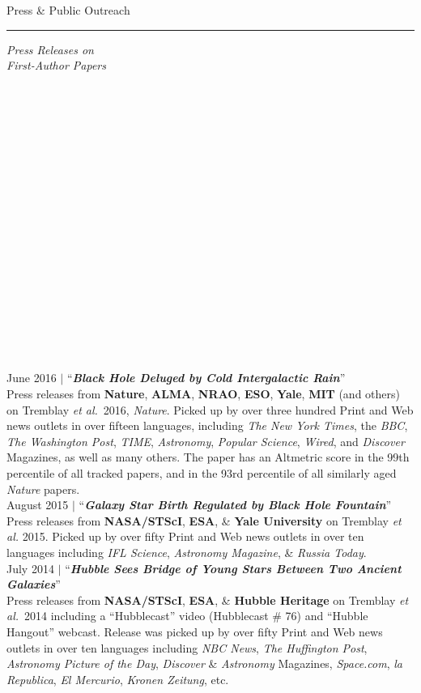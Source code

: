 \documentclass[11pt]{article}
\makeatletter
\def\vhrulefill#1{\leavevmode\leaders\hrule\@height#1\hfill \kern\z@}
\makeatother
\begin{document}
\clearpage

{\sc Press \& Public Outreach} \vhrulefill{0.4pt}


\vspace{5mm}


\hspace{2.5mm} \parbox{1.5in}{{\it Press Releases on \\ First-Author Papers \\ \\ \\ \\ \\  \\ \\ \\ \\ \\ \\ \\ \\ \\ \\ \\ \\ \\ \\  }}
\parbox{5.15in}{
June 2016 $|$ ``\textit{\textbf{Black Hole Deluged by Cold Intergalactic Rain}}'' \\ Press releases from {\bf Nature}, {\bf ALMA}, {\bf NRAO}, {\bf ESO}, {\bf Yale}, {\bf MIT} (and others) on Tremblay {\it et al.}~2016, {\it Nature}. Picked up by over three hundred Print and Web news outlets in over fifteen languages, including {\it The New York Times}, the {\it BBC}, {\it The Washington Post}, {\it TIME}, {\it Astronomy}, {\it Popular Science}, {\it Wired}, and {\it Discover} Magazines, as well as many others. The paper has an Altmetric score in the 99th percentile of all tracked papers, and in the 93rd percentile of all similarly aged {\it Nature} papers.   \\


August 2015 $|$ ``\textit{\textbf{Galaxy Star Birth Regulated by Black Hole Fountain}}''\\
Press releases from {\bf NASA/STScI}, {\bf ESA}, \& {\bf Yale University} on Tremblay {\it et al.} 2015. Picked up by over fifty Print and Web news outlets in over ten languages including {\it IFL Science}, {\it Astronomy Magazine}, \& {\it Russia Today}. \\

July 2014 $|$ ``\textbf{\textit{Hubble Sees Bridge of Young Stars Between Two Ancient Galaxies}}''\\ Press releases from {\bf NASA/STScI}, {\bf ESA}, \& {\bf Hubble Heritage} on Tremblay {\it et al.}~2014 including a ``Hubblecast'' video (Hubblecast \# 76) and ``Hubble Hangout'' webcast. Release was picked up by over fifty Print and Web news outlets in over ten languages including {\it NBC News}, {\it The Huffington Post}, {\it Astronomy Picture of the Day}, {\it Discover} \& {\it Astronomy} Magazines, {\it Space.com}, {\it la Republica}, {\it El Mercurio}, {\it Kronen Zeitung}, etc. \\}
\end{document}
